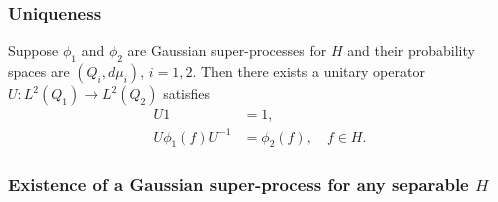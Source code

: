 \documentclass[openany, a4paper, oneside]{jsbook}
\begin{document}
\subsubsection{Uniqueness}

\begin{thm}
 Suppose $\phi_1$ and $\phi_2$ are Gaussian super-processes for $H$ and their probability spaces are $(Q_i, d \mu_i)$, $i=1,2$.
 Then there exists a unitary operator $U \colon L^2 (Q_1) \to L^2 (Q_2)$ satisfies
 \begin{align}
  U1 &= 1, \\
  U \phi_1 (f) U^{-1} &= \phi_2 (f), \quad f \in H.
 \end{align}
\end{thm}
\subsubsection{Existence of a Gaussian super-process for any separable $H$}
\end{document}
